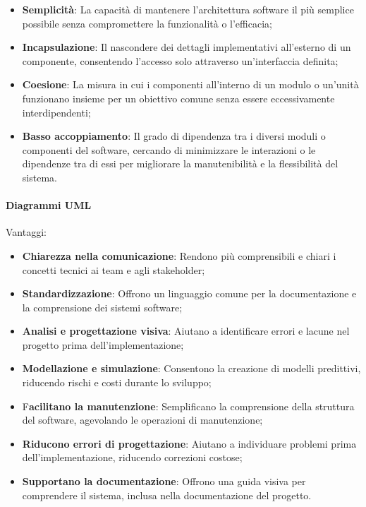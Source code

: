 \begin{itemize}
    \item \textbf{Semplicità}: La capacità di mantenere l'architettura software il più semplice possibile senza compromettere la funzionalità o l'efficacia;
    \item \textbf{Incapsulazione}: Il nascondere dei dettagli implementativi all'esterno di un componente, consentendo l'accesso solo attraverso un'interfaccia definita;
    \item \textbf{Coesione}: La misura in cui i componenti all'interno di un modulo o un'unità funzionano insieme per un obiettivo comune senza essere eccessivamente interdipendenti;
    \item \textbf{Basso accoppiamento}: Il grado di dipendenza tra i diversi moduli o componenti del software, cercando di minimizzare le interazioni o le dipendenze tra di essi per migliorare la manutenibilità e la flessibilità del sistema.
\end{itemize}

\paragraph{Diagrammi UML}
Vantaggi:
\begin{itemize}
    \item \textbf{Chiarezza nella comunicazione}: Rendono più comprensibili e chiari i concetti tecnici ai team e agli stakeholder;
    \item \textbf{Standardizzazione}: Offrono un linguaggio comune per la documentazione e la comprensione dei sistemi software;
    \item \textbf{Analisi e progettazione visiva}: Aiutano a identificare errori e lacune nel progetto prima dell'implementazione;
    \item \textbf{Modellazione e simulazione}: Consentono la creazione di modelli predittivi, riducendo rischi e costi durante lo sviluppo;
    \item F\textbf{acilitano la manutenzione}: Semplificano la comprensione della struttura del software, agevolando le operazioni di manutenzione;
    \item \textbf{Riducono errori di progettazione}: Aiutano a individuare problemi prima dell'implementazione, riducendo correzioni costose;
    \item \textbf{Supportano la documentazione}: Offrono una guida visiva per comprendere il sistema, inclusa nella documentazione del progetto.
\end{itemize}

